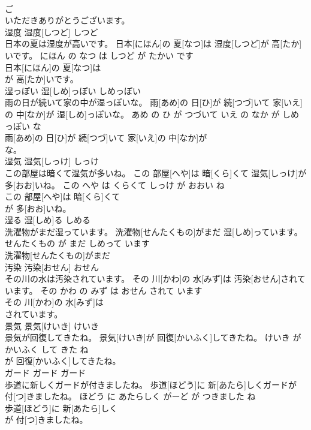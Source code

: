 \documentclass[8pt]{extreport}
\begin{document}
\begin{CJK}{UTF8}{min}
\\	ご
\\	いただきありがとうございます。			
\\	湿度	湿度[しつど]	しつど	
\\	日本の夏は湿度が高いです。	日本[にほん]の 夏[なつ]は 湿度[しつど]が 高[たか]いです。	にほん の なつ は しつど が たかい です	
\\	日本[にほん]の 夏[なつ]は
\\	が 高[たか]いです。			
\\	湿っぽい	湿[しめ]っぽい	しめっぽい	
\\	雨の日が続いて家の中が湿っぽいな。	雨[あめ]の 日[ひ]が 続[つづ]いて 家[いえ]の 中[なか]が 湿[しめ]っぽいな。	あめ の ひ が つづいて いえ の なか が しめっぽい な	
\\	雨[あめ]の 日[ひ]が 続[つづ]いて 家[いえ]の 中[なか]が
\\	な。			
\\	湿気	湿気[しっけ]	しっけ	
\\	この部屋は暗くて湿気が多いね。	この 部屋[へや]は 暗[くら]くて 湿気[しっけ]が 多[おお]いね。	この へや は くらくて しっけ が おおい ね	
\\	この 部屋[へや]は 暗[くら]くて
\\	が 多[おお]いね。			
\\	湿る	湿[しめ]る	しめる	
\\	洗濯物がまだ湿っています。	洗濯物[せんたくもの]がまだ 湿[しめ]っています。	せんたくもの が まだ しめって います	
\\	洗濯物[せんたくもの]がまだ
\\	汚染	汚染[おせん]	おせん	
\\	その川の水は汚染されています。	その 川[かわ]の 水[みず]は 汚染[おせん]されています。	その かわ の みず は おせん されて います	
\\	その 川[かわ]の 水[みず]は
\\	されています。			
\\	景気	景気[けいき]	けいき	
\\	景気が回復してきたね。	景気[けいき]が 回復[かいふく]してきたね。	けいき が かいふく して きた ね	
\\	が 回復[かいふく]してきたね。			
\\	ガード	ガード	ガード	
\\	歩道に新しくガードが付きましたね。	歩道[ほどう]に 新[あたら]しくガードが 付[つ]きましたね。	ほどう に あたらしく がーど が つきました ね	
\\	歩道[ほどう]に 新[あたら]しく
\\	が 付[つ]きましたね。			

\end{CJK}
\end{document}
